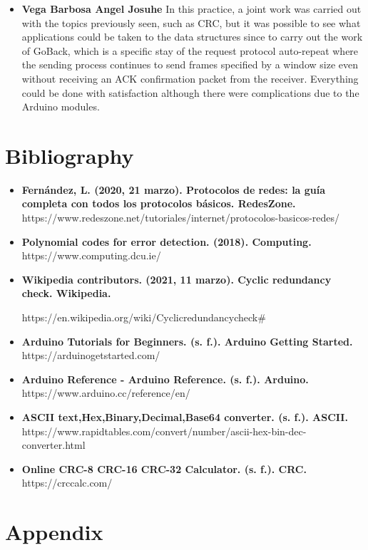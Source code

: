\documentclass[journal,trans]{IEEEtran}
\begin{document}
\begin{itemize}
\item \textbf{Vega Barbosa Angel Josuhe}
In this practice, a joint work was carried out with the topics previously seen, such as CRC, but it was possible to see what applications could be taken to the data structures since to carry out the work of GoBack, which is a specific stay of the request protocol auto-repeat where the sending process continues to send frames specified by a window size even without receiving an ACK confirmation packet from the receiver. Everything could be done with satisfaction although there were complications due to the Arduino modules.
\end{itemize}
\section{\textbf{Bibliography}}

\begin{itemize}
\item \textbf{Fernández, L. (2020, 21 marzo). Protocolos de redes: la guía completa con todos los protocolos básicos. RedesZone.}
https://www.redeszone.net/tutoriales/internet/protocolos-basicos-redes/
\item \textbf{Polynomial codes for error detection. (2018). Computing.}
https://www.computing.dcu.ie/%

\item \textbf{Wikipedia contributors. (2021, 11 marzo). Cyclic redundancy check. Wikipedia.}

https://en.wikipedia.org/wiki/Cyclicredundancycheck#
\item \textbf{Arduino Tutorials for Beginners. (s. f.). Arduino Getting Started.}
https://arduinogetstarted.com/

\item \textbf{Arduino Reference - Arduino Reference. (s. f.). Arduino.}
https://www.arduino.cc/reference/en/

\item \textbf{ASCII text,Hex,Binary,Decimal,Base64 converter. (s. f.). ASCII. }
https://www.rapidtables.com/convert/number/ascii-hex-bin-dec-converter.html
\item \textbf{Online CRC-8 CRC-16 CRC-32 Calculator. (s. f.). CRC.}
https://crccalc.com/

\end{itemize}
\section{\textbf{Appendix}}
\end{document}
